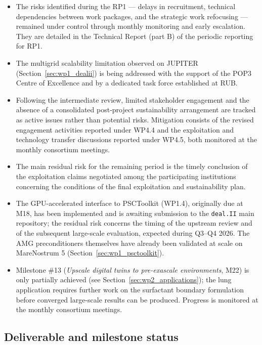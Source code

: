 \documentclass[a4paper,12pt, numbers]{article}
\newcommand{\dealii}{\texttt{deal.II}}
\begin{document}
\begin{itemize}[left=1em, itemsep=0pt, topsep=0pt]
	\item The risks identified during the RP1 --- delays in recruitment, technical dependencies between work packages, and the strategic work refocusing --- remained under control through monthly monitoring and early escalation. They are detailed in the Technical Report (part B) of the periodic reporting for RP1.
	\item The multigrid scalability limitation observed on JUPITER (Section~\ref{sec:wp1_dealii}) is being addressed with the support of the POP3 Centre of Excellence and by a dedicated task force established at RUB.
	\item Following the intermediate review, limited stakeholder engagement and the absence of a consolidated post-project sustainability arrangement are tracked as active issues rather than potential risks. Mitigation consists of the revised engagement activities reported under WP4.4 and the exploitation and technology transfer discussions reported under WP4.5, both monitored at the monthly consortium meetings.
	\item The main residual risk for the remaining period is the timely conclusion of the exploitation claims negotiated among the participating institutions concerning the conditions of the final exploitation and sustainability plan.
	\item The GPU-accelerated interface to PSCToolkit (WP1.4), originally due at M18, has been implemented and is awaiting submission to the \dealii{} main repository; the residual risk concerns the timing of the upstream review and of the subsequent large-scale evaluation, expected during Q3--Q4 2026. The AMG preconditioners themselves have already been validated at scale on MareNostrum 5 (Section~\ref{sec:wp1_psctoolkit}).
	\item Milestone \#13 (\emph{Upscale digital twins to pre-exascale environments}, M22) is only partially achieved (see Section~\ref{sec:wp2_applications}); the lung application requires further work on the surfactant boundary formulation before converged large-scale results can be produced. Progress is monitored at the monthly consortium meetings.
	
	
\end{itemize}

\subsection{Deliverable and milestone status}
\end{document}
